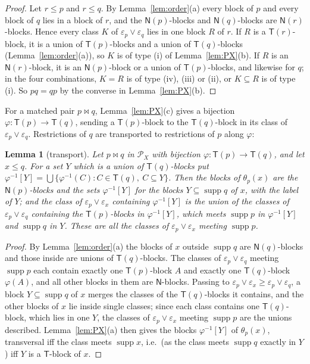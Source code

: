 \documentclass[11pt]{amsart}
\newtheorem{lemma}[theorem]{Lemma}
\theoremstyle{definition}
\renewcommand{\P}{\mathcal{P}}      %
\newcommand{\supp}{\operatorname{supp}}
\newcommand{\T}{\mathsf{T}}
\newcommand{\N}{\mathsf{N}}
\newcommand{\mt}{\bowtie}      %
\begin{document}
\begin{proof}
Let $r\le p$ and $r\le q$. By Lemma~\ref{lem:order}(a) every block of $p$ and every block of $q$ lies in a block of $r$, and the $\N(p)$-blocks and $\N(q)$-blocks are $\N(r)$-blocks. Hence every class $K$ of $\varepsilon_p\vee\varepsilon_q$ lies in one block $R$ of $r$. If $R$ is a $\T(r)$-block, it is a union of $\T(p)$-blocks and a union of $\T(q)$-blocks (Lemma~\ref{lem:order}(a)), so $K$ is of type (i) of Lemma~\ref{lem:PX}(b). If $R$ is an $\N(r)$-block, it is an $\N(p)$-block or a union of $\T(p)$-blocks, and likewise for $q$; in the four combinations, $K=R$ is of type (iv), (iii) or (ii), or $K\subseteq R$ is of type (i). So $pq=qp$ by the converse in Lemma~\ref{lem:PX}(b).
\end{proof}

For a matched pair $p\mt q$, Lemma~\ref{lem:PX}(c) gives a bijection $\varphi\colon\T(p)\to\T(q)$, sending a $\T(p)$-block to the $\T(q)$-block in its class of $\varepsilon_p\vee\varepsilon_q$. Restrictions of $q$ are transported to restrictions of $p$ along $\varphi$:

\begin{lemma}[transport]\label{lem:transport}
Let $p\mt q$ in $\P_X$ with bijection $\varphi\colon\T(p)\to\T(q)$, and let $x\le q$. For a set $Y$ which is a union of $\T(q)$-blocks put $\varphi^{-1}[Y]=\bigcup\{\varphi^{-1}(C):C\in\T(q),\ C\subseteq Y\}$. Then the blocks of $\theta_p(x)$ are the $\N(p)$-blocks and the sets $\varphi^{-1}[Y]$ for the blocks $Y\subseteq\supp q$ of $x$, with the label of $Y$; and the class of $\varepsilon_p\vee\varepsilon_x$ containing $\varphi^{-1}[Y]$ is the union of the classes of $\varepsilon_p\vee\varepsilon_q$ containing the $\T(p)$-blocks in $\varphi^{-1}[Y]$, which meets $\supp p$ in $\varphi^{-1}[Y]$ and $\supp q$ in $Y$. These are all the classes of $\varepsilon_p\vee\varepsilon_x$ meeting $\supp p$.
\end{lemma}

\begin{proof}
By Lemma~\ref{lem:order}(a) the blocks of $x$ outside $\supp q$ are $\N(q)$-blocks and those inside are unions of $\T(q)$-blocks. The classes of $\varepsilon_p\vee\varepsilon_q$ meeting $\supp p$ each contain exactly one $\T(p)$-block $A$ and exactly one $\T(q)$-block $\varphi(A)$, and all other blocks in them are $\N$-blocks. Passing to $\varepsilon_p\vee\varepsilon_x\ge\varepsilon_p\vee\varepsilon_q$, a block $Y\subseteq\supp q$ of $x$ merges the classes of the $\T(q)$-blocks it contains, and the other blocks of $x$ lie inside single classes; since each class contains one $\T(q)$-block, which lies in one $Y$, the classes of $\varepsilon_p\vee\varepsilon_x$ meeting $\supp p$ are the unions described. Lemma~\ref{lem:PX}(a) then gives the blocks $\varphi^{-1}[Y]$ of $\theta_p(x)$, transversal iff the class meets $\supp x$, i.e.\ (as the class meets $\supp q$ exactly in $Y$) iff $Y$ is a $\T$-block of $x$.
\end{proof}
\end{document}
